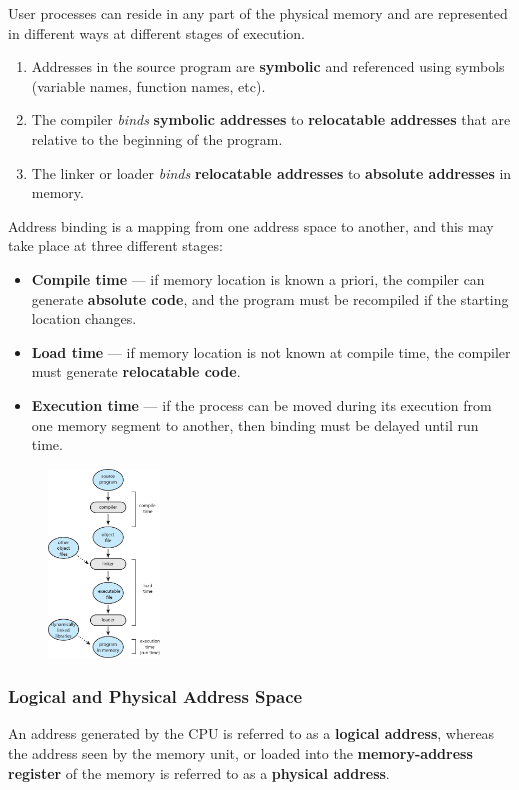 \documentclass{article}
\begin{document}
User processes can reside in any part of the physical memory and are
represented in different ways at different stages of execution.
\begin{enumerate}
    \item Addresses in the source program are \textbf{symbolic} and
          referenced using symbols (variable names, function names,
          etc).
    \item The compiler \textit{binds} \textbf{symbolic addresses} to
          \textbf{relocatable addresses} that are relative to the
          beginning of the program.
    \item The linker or loader \textit{binds} \textbf{relocatable
          addresses} to \textbf{absolute addresses} in memory.
\end{enumerate}
Address binding is a mapping from one address space to another, and this
may take place at three different stages:
\begin{itemize}
    \item \textbf{Compile time} --- if memory location is known a
          priori, the compiler can generate \textbf{absolute code}, and
          the program must be recompiled if the starting location changes.
    \item \textbf{Load time} --- if memory location is not known at
          compile time, the compiler must generate \textbf{relocatable
              code}.
    \item \textbf{Execution time} --- if the process can be moved during
          its execution from one memory segment to another, then binding
          must be delayed until run time.
\end{itemize}
\begin{figure}[H]
    \centering
    \includegraphics[height = 5cm]{figures/address_binding.pdf}
\end{figure}
\subsubsection{Logical and Physical Address Space}
An address generated by the CPU is referred to as a \textbf{logical
address}, whereas the address seen by the memory unit, or loaded into
the \textbf{memory-address register} of the memory is referred to as a
\textbf{physical address}.
\end{document}
